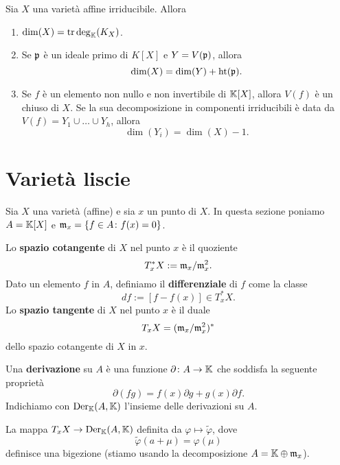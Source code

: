 \begin{theorem}
    Sia $X$ una varietà affine irriducibile. Allora \begin{enumerate}
        \item $\dim(X)=\operatorname{tr\,deg}_{\mathbb{K}}(K_X)$. 
        \item Se $\mathfrak{p}$ è un ideale primo di $K[X]$ e $Y=V(\mathfrak{p})$, allora \[\dim(X)=\dim(Y)+\operatorname{ht}(\mathfrak{p}).\]
        \item Se $f$ è un elemento non nullo e non invertibile di $\mathbb{K}[X]$, allora $V(f)$ è un chiuso di $X$. Se la sua decomposizione in componenti irriducibili è data da $V(f)=Y_1\cup\ldots\cup Y_h$, allora \[\dim(Y_i)=\dim(X)-1.\]
    \end{enumerate}
\end{theorem}
















\section{Variet\`a liscie}
\begin{notation}
Sia $X$ una varietà (affine) e sia $x$ un punto di $X$. In questa sezione poniamo $A=\mathbb{K}[X]$ e $\mathfrak{m}_x=\{f\in A\colon f(x)=0\}$.
\end{notation}


\begin{definition}
    Lo \textbf{spazio cotangente} di $X$ nel punto $x$ è il quoziente 
    \[T^\ast_x X:= \mathfrak{m}_x/\mathfrak{m}_x^2.\]
    Dato un elemento $f$ in $A$, definiamo il \textbf{differenziale} di $f$ come la classe 
    \[df:= [f-f(x)]\in T^\ast_x X.\] 
    Lo \textbf{spazio tangente} di $X$ nel punto $x$ è il duale 
    \[T_x X=(\mathfrak{m}_x/\mathfrak{m}_x^2)^\ast\]
    dello spazio cotangente di $X$ in $x$.
\end{definition}

\begin{definition}
    Una \textbf{derivazione} su $A$ è una funzione $\partial\colon A \to \mathbb{K}$ che soddisfa la seguente proprietà \[\partial(fg)=f(x)\partial g + g(x)\partial f.\]
    Indichiamo con $\operatorname{Der}_{\mathbb{K}}(A,\mathbb{K})$ l'insieme delle derivazioni su $A$.
\end{definition}

\begin{exercise}
    La mappa $T_xX \to \operatorname{Der}_{\mathbb{K}}(A,\mathbb{K})$ definita da $\varphi\mapsto \widetilde{\varphi}$, dove \[\widetilde{\varphi}(a+\mu)=\varphi(\mu)\] definisce una bigezione (stiamo usando la decomposizione $A=\mathbb{K}\oplus \mathfrak{m}_x$).
\end{exercise}

